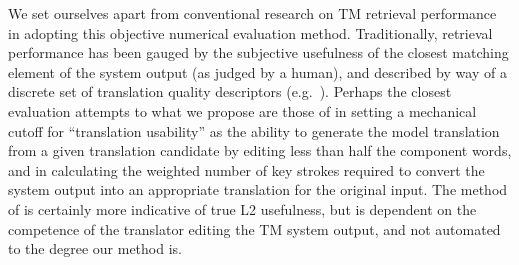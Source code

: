 We set ourselves apart from conventional research on TM retrieval
performance in adopting this objective numerical evaluation method.
Traditionally, retrieval performance has been gauged by the subjective
usefulness of the closest matching element of the system output (as
judged by a human), and described by way of a discrete set of
translation quality descriptors (e.g.\ 
\cite{Nakamura89,Sumita91,Sato92}). Perhaps the closest evaluation
attempts to what we propose are those of \citeB{Planas99} in setting a
mechanical cutoff for ``translation usability'' as the ability to
generate the model translation from a given translation candidate by
editing less than half the component words, and \citeB{Nirenburg93} in
calculating the weighted number of key strokes required to convert the
system output into an appropriate translation for the original input.
The method of \citeB{Nirenburg93} is certainly more indicative of true
L2 usefulness, but is dependent on the competence of the translator
editing the TM system output, and not automated to the degree our method
is.



